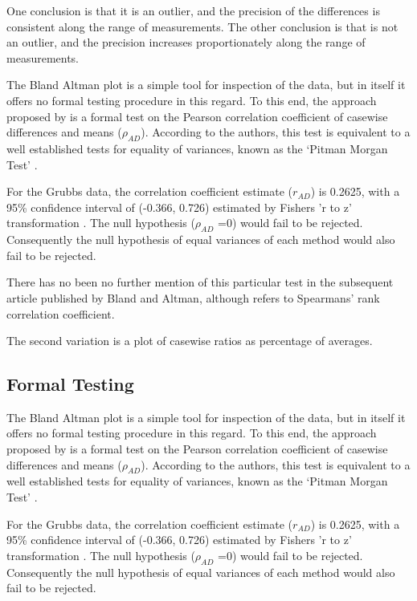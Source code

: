 \documentclass[12pt, a4paper]{report}
\begin{document}
One conclusion is that it is an outlier, and the precision of the
differences is consistent along the range of measurements. The
other conclusion is that is not an outlier, and the precision
increases proportionately along the range of measurements.

The Bland Altman plot is a simple tool for inspection of the data,
but in itself it offers no formal testing procedure in this
regard. To this end, the approach proposed by \citet{BA83} is a
formal test on the Pearson correlation coefficient  of casewise
differences and means ($\rho_{AD}$). According to the authors,
this test is equivalent to a well established tests for equality
of variances, known as the `Pitman Morgan Test' \citep{Pitman,
Morgan}.

For the Grubbs data, the correlation coefficient estimate
($r_{AD}$) is 0.2625, with a 95\% confidence interval of (-0.366,
0.726) estimated by Fishers 'r to z' transformation \citep{Cohen}.
The null hypothesis ($\rho_{AD}$ =0) would fail to be rejected.
Consequently the null hypothesis of equal variances of each method
would also fail to be rejected.

There has no been no further mention of this particular test in
the subsequent article published by Bland and Altman, although
\citet{BA99} refers to Spearmans' rank correlation coefficient.

The second variation is a plot of casewise ratios as percentage of
averages.



\subsection{Formal Testing}
The Bland Altman plot is a simple tool for inspection of the data,
but in itself it offers no formal testing procedure in this
regard. To this end, the approach proposed by \citet{BA83} is a
formal test on the Pearson correlation coefficient  of casewise
differences and means ($\rho_{AD}$). According to the authors,
this test is equivalent to a well established tests for equality
of variances, known as the `Pitman Morgan Test' \citep{Pitman,
Morgan}.

For the Grubbs data, the correlation coefficient estimate
($r_{AD}$) is 0.2625, with a 95\% confidence interval of (-0.366,
0.726) estimated by Fishers 'r to z' transformation \citep{Cohen}.
The null hypothesis ($\rho_{AD}$ =0) would fail to be rejected.
Consequently the null hypothesis of equal variances of each method
would also fail to be rejected.
\end{document}
